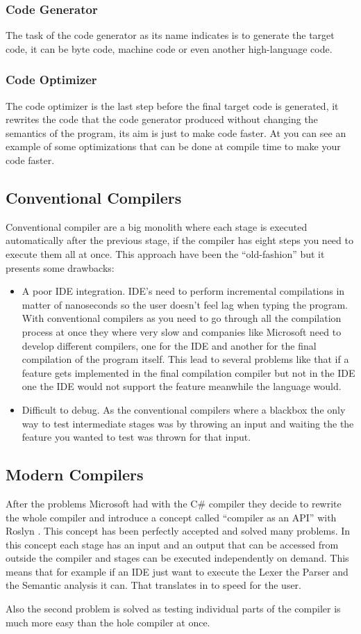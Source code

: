 \subsubsection{Code Generator}
The task of the code generator as its name indicates is to generate the target code, it can be byte code, machine code or even another high-language code.

\subsubsection{Code Optimizer}
The code optimizer is the last step before the final target code is generated, it rewrites the code that the code generator produced without changing the semantics of the program, its aim is just to make code faster. At  you can see an example of some optimizations that can be done at compile time to make your code faster.

\subsection{Conventional Compilers}
Conventional compiler are a big monolith where each stage  is executed automatically after the previous stage, if the compiler has eight steps you need to execute them all at once. This approach have been the “old-fashion” but it presents some drawbacks:
\begin{itemize}
	\item A poor IDE  integration. IDE’s need to perform incremental compilations in matter of nanoseconds so the user doesn’t feel lag when typing the program. With conventional compilers as you need to go through all the compilation process at once they where very slow and companies like Microsoft need to develop different compilers, one for the IDE and another for the final compilation of the program itself. This lead to several problems like that if a feature gets implemented in the final compilation compiler but not in the IDE one the IDE would not support the feature meanwhile the language would.
	\item Difficult to debug. As the conventional compilers where a blackbox the only way to test intermediate stages was by throwing an input and waiting the the feature you wanted to test was thrown for that input.
\end{itemize}

\subsection{Modern Compilers}
After the problems Microsoft had with the C\# compiler they decide to rewrite the whole compiler and introduce a concept called “compiler as an API” with Roslyn . This concept has been perfectly accepted and solved many problems. In this concept each stage has an input and an output that can be accessed from outside the compiler and stages can be executed independently on demand. This means that for example if an IDE just want to execute the Lexer the Parser and the Semantic analysis it can. That translates in to speed for the user.

Also the second problem is solved as testing individual parts of the compiler is much more easy than the hole compiler at once.
